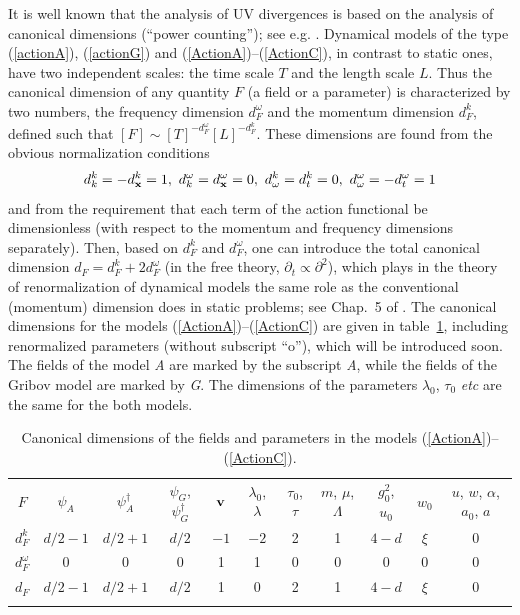 \documentclass[12pt]{article}
\begin{document}
It is well known that the analysis of UV divergences is based on the analysis
of canonical dimensions (``power counting''); see e.g. \cite{Zinn,Book3}.
Dynamical models of the type (\ref{actionA}), (\ref{actionG}) and
(\ref{ActionA})--(\ref{ActionC}), in contrast to static ones, have
two independent scales: the time scale $T$ and the length scale $L$. Thus
the canonical dimension of any quantity $F$ (a field or a parameter) is
characterized by two numbers, the
frequency dimension $d_{F}^{\omega}$ and the momentum dimension $d_{F}^{k}$,
defined such that $[F] \sim [T]^{-d_{F}^{\omega}} [L]^{-d_{F}^{k}}$. These
dimensions are found from the obvious normalization conditions
\[ d_k^k=-d_{\bf x}^k=1,\ d_k^{\omega} =d_{\bf x}^{\omega }=0,\
d_{\omega }^k=d_t^k=0, \ d_{\omega }^{\omega }=-d_t^{\omega }=1 \]
and from the requirement
that each term of the action functional be dimensionless (with
respect to the momentum and frequency dimensions separately).
Then, based on $d_{F}^{k}$ and $d_{F}^{\omega}$,
one can introduce the total canonical dimension
$d_{F}=d_{F}^{k}+2d_{F}^{\omega}$ (in the free theory,
$\partial_{t}\propto\partial^{2}$), which plays in the theory of
renormalization of dynamical models the same role as
the conventional (momentum) dimension does in static problems;
see Chap.~5 of \cite{Book3}.
The canonical dimensions for the models (\ref{ActionA})--(\ref{ActionC})
are given in table~\ref{table1}, including renormalized parameters (without
subscript ``o''), which will be introduced soon.
The fields of the model {\it A} are marked by the subscript {\it A},
while the fields of the Gribov model are marked by {\it G}. The dimensions
of the parameters $\lambda_{0}$, $\tau_{0}$ {\it etc} are the same for the
both models.

\begin{table}
\caption{Canonical dimensions of the fields and parameters in the
models (\protect\ref{ActionA})--(\protect\ref{ActionC}).}
\label{table1}
\begin{tabular}{ccccccccccc}
\br
$F$ & $\psi_{A}$ & $\psi_{A}^{\dag}$ & $\psi_{G}$, $\psi_{G}^{\dag}$ &
$ {\bf v} $ &   $\lambda_{0}$, $\lambda$ &
$\tau_{0}$, $\tau$ &  $m$, $\mu$, $\Lambda$ & $g_{0}^{2}$, $u_{0}$ &
$w_{0}$ & $u$, $w$, $\alpha$, $a_{0}$, $a$ \\
\br
$d_{F}^{k}$ & $d/2-1$ & $d/2+1$ & $d/2$ & $-1$ & $-2$  & 2
& 1 &  $4-d$ & $\xi$ & 0 \\
\mr
$d_{F}^{\omega }$ & 0 & 0& 0 & 1 & 1 & 0 & 0 &  0 & 0 & 0 \\
\mr
$d_{F}$ & $d/2-1$ & $d/2+1$ &
$d/2$ & 1 & 0 & 2 & 1 &  $4-d$  & $\xi$ & 0 \\
\br
\end{tabular}
\end{table}
\end{document}
